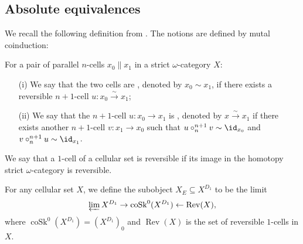 \subsection{Absolute equivalences}
We recall the following definition from \cite{lmw}. The notions are defined by mutal coinduction:
\begin{defn} For a pair of parallel \(n\)-cells \(x_0\parallel x_1\) in a strict \(\omega\)-category \(X\):
\begin{enumerate}
\item[(i)] We say that the two cells are , denoted by \(x_0 \sim x_1\), if there exists a reversible \(n+1\)-cell \(u:x_0 \xrightarrow{\sim} x_1\);
\item[(ii)] We say that the \(n+1\)-cell \(u:x_0\to x_1\) is , denoted by \(x\xrightarrow{\sim} x_1\) if there exists another \(n+1\)-cell \(v:x_1\to x_0\) such that \(u\circ^{n+1}_n v \sim \id_{x_0}\)  and \(v\circ^{n+1}_n u \sim \id_{x_1}\).
\end{enumerate}
\end{defn}

We say that a \(1\)-cell of a cellular set is reversible if its image in the homotopy strict \(\omega\)-category is reversible. 

For any cellular set \(X\), we define the subobject \(X_E \subseteq X^{D_1}\) to be the limit \[\varprojlim X^{D_1}\to \operatorname{coSk}^0(X^{D_1}) \leftarrow \operatorname{Rev}(X),\] where \(\operatorname{coSk}^0(X^{D_1})=(X^{D_1})_0\) and \(\operatorname{Rev}(X)\) is the set of reversible \(1\)-cells in \(X\).  



